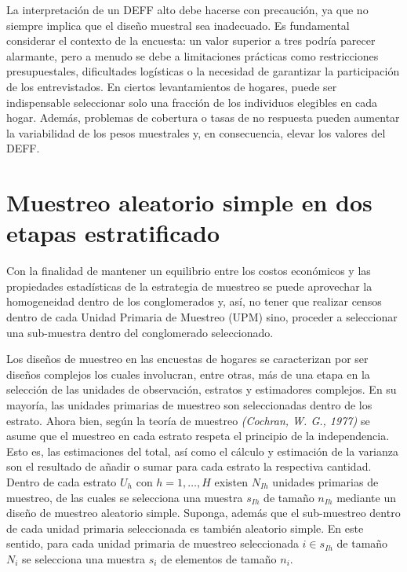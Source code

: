 \documentclass[
  spanish,
  12pt,
]{book}
\begin{document}
La interpretación de un DEFF alto debe hacerse con precaución, ya que no siempre implica que el diseño muestral sea inadecuado. Es fundamental considerar el contexto de la encuesta: un valor superior a tres podría parecer alarmante, pero a menudo se debe a limitaciones prácticas como restricciones presupuestales, dificultades logísticas o la necesidad de garantizar la participación de los entrevistados. En ciertos levantamientos de hogares, puede ser indispensable seleccionar solo una fracción de los individuos elegibles en cada hogar. Además, problemas de cobertura o tasas de no respuesta pueden aumentar la variabilidad de los pesos muestrales y, en consecuencia, elevar los valores del DEFF.

\section{Muestreo aleatorio simple en dos etapas estratificado}\label{muestreo-aleatorio-simple-en-dos-etapas-estratificado}

Con la finalidad de mantener un equilibrio entre los costos económicos y las propiedades estadísticas de la estrategia de muestreo se puede aprovechar la homogeneidad dentro de los conglomerados y, así, no tener que realizar censos dentro de cada Unidad Primaria de Muestreo (UPM) sino, proceder a seleccionar una sub-muestra dentro del conglomerado seleccionado.

Los diseños de muestreo en las encuestas de hogares se caracterizan por ser diseños complejos los cuales involucran, entre otras, más de una etapa en la selección de las unidades de observación, estratos y estimadores complejos. En su mayoría, las unidades primarias de muestreo son seleccionadas dentro de los estrato. Ahora bien, según la teoría de muestreo \emph{(Cochran, W. G., 1977)} se asume que el muestreo en cada estrato respeta el principio de la independencia. Esto es, las estimaciones del total, así como el cálculo y estimación de la varianza son el resultado de añadir o sumar para cada estrato la respectiva cantidad. Dentro de cada estrato \(U_h\) con \(h=1,\ldots, H\) existen \(N_{Ih}\) unidades primarias de muestreo, de las cuales se selecciona una muestra \(s_{Ih}\) de tamaño \(n_{Ih}\) mediante un diseño de muestreo aleatorio simple. Suponga, además que el sub-muestreo dentro de cada unidad primaria seleccionada es también aleatorio simple. En este sentido, para cada unidad primaria de muestreo seleccionada \(i\in s_{Ih}\) de tamaño \(N_i\) se selecciona una muestra \(s_i\) de elementos de tamaño \(n_i\).
\end{document}
